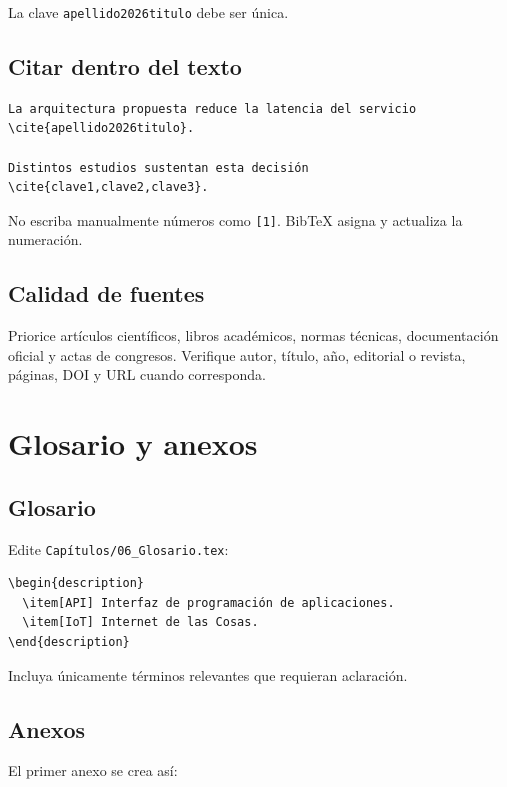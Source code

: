 \documentclass[12pt,a4paper,oneside]{report}
\begin{document}
La clave \texttt{apellido2026titulo} debe ser única.

\section{Citar dentro del texto}

\begin{lstlisting}
La arquitectura propuesta reduce la latencia del servicio \cite{apellido2026titulo}.

Distintos estudios sustentan esta decisión \cite{clave1,clave2,clave3}.
\end{lstlisting}

No escriba manualmente números como \texttt{[1]}. BibTeX asigna y actualiza la numeración.

\section{Calidad de fuentes}

Priorice artículos científicos, libros académicos, normas técnicas, documentación oficial y actas de congresos. Verifique autor, título, año, editorial o revista, páginas, DOI y URL cuando corresponda.

\chapter{Glosario y anexos}

\section{Glosario}

Edite \texttt{Capítulos/06\_Glosario.tex}:

\begin{lstlisting}
\begin{description}
  \item[API] Interfaz de programación de aplicaciones.
  \item[IoT] Internet de las Cosas.
\end{description}
\end{lstlisting}

Incluya únicamente términos relevantes que requieran aclaración.

\section{Anexos}

El primer anexo se crea así:
\end{document}
